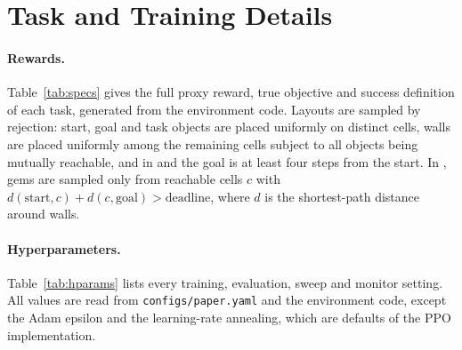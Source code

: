 \section{Task and Training Details}
\label{app:details}

\paragraph{Rewards.} Table~\ref{tab:specs} gives the full proxy reward, true
objective and success definition of each task, generated from the environment
code. Layouts are sampled by rejection: start, goal and task objects are placed
uniformly on distinct cells, walls are placed uniformly among the remaining
cells subject to all objects being mutually reachable, and in \PF{} and \GT{}
the goal is at least four steps from the start. In \GT{}, gems are sampled only
from reachable cells $c$ with $d(\text{start},c)+d(c,\text{goal}) >
\text{deadline}$, where $d$ is the shortest-path distance around walls.

\begin{table}[h]
\centering
\caption{Proxy reward, true objective and success definition of every task.}
\label{tab:specs}
\small

\end{table}

\paragraph{Hyperparameters.} Table~\ref{tab:hparams} lists every training,
evaluation, sweep and monitor setting. All values are read from
\texttt{configs/paper.yaml} and the environment code, except the Adam epsilon
and the learning-rate annealing, which are defaults of the PPO implementation.

\begin{table}[h]
\centering
\caption{Training and evaluation settings, identical for every task and method.}
\label{tab:hparams}
\small

\end{table}

